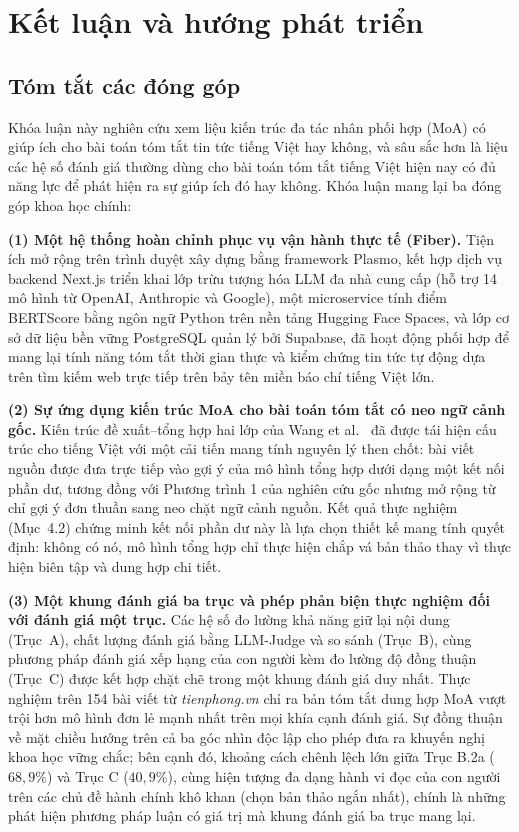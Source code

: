 \chapter{Kết luận và hướng phát triển}
\label{ch:conclusion}

\section{Tóm tắt các đóng góp}

Khóa luận này nghiên cứu xem liệu kiến trúc đa tác nhân phối hợp (MoA) có giúp ích cho bài toán tóm tắt tin tức tiếng Việt hay không, và sâu sắc hơn là liệu các hệ số đánh giá thường dùng cho bài toán tóm tắt tiếng Việt hiện nay có đủ năng lực để phát hiện ra sự giúp ích đó hay không. Khóa luận mang lại ba đóng góp khoa học chính: 

\textbf{(1) Một hệ thống hoàn chỉnh phục vụ vận hành thực tế (Fiber).} Tiện ích mở rộng trên trình duyệt xây dựng bằng framework Plasmo, kết hợp dịch vụ backend Next.js triển khai lớp trừu tượng hóa LLM đa nhà cung cấp (hỗ trợ 14 mô hình từ OpenAI, Anthropic và Google), một microservice tính điểm BERTScore bằng ngôn ngữ Python trên nền tảng Hugging Face Spaces, và lớp cơ sở dữ liệu bền vững PostgreSQL quản lý bởi Supabase, đã hoạt động phối hợp để mang lại tính năng tóm tắt thời gian thực và kiểm chứng tin tức tự động dựa trên tìm kiếm web trực tiếp trên bảy tên miền báo chí tiếng Việt lớn.

\textbf{(2) Sự ứng dụng kiến trúc MoA cho bài toán tóm tắt có neo ngữ cảnh gốc.} Kiến trúc đề xuất--tổng hợp hai lớp của Wang et al.\ \cite{Wang2024} đã được tái hiện cấu trúc cho tiếng Việt với một cải tiến mang tính nguyên lý then chốt: bài viết nguồn được đưa trực tiếp vào gợi ý của mô hình tổng hợp dưới dạng một kết nối phần dư, tương đồng với Phương trình 1 của nghiên cứu gốc nhưng mở rộng từ chỉ gợi ý đơn thuần sang neo chặt ngữ cảnh nguồn. Kết quả thực nghiệm (Mục~4.2) chứng minh kết nối phần dư này là lựa chọn thiết kế mang tính quyết định: không có nó, mô hình tổng hợp chỉ thực hiện chắp vá bản thảo thay vì thực hiện biên tập và dung hợp chi tiết.

\textbf{(3) Một khung đánh giá ba trục và phép phản biện thực nghiệm đối với đánh giá một trục.} Các hệ số đo lường khả năng giữ lại nội dung (Trục~A), chất lượng đánh giá bằng LLM-Judge và so sánh (Trục~B), cùng phương pháp đánh giá xếp hạng của con người kèm đo lường độ đồng thuận (Trục~C) được kết hợp chặt chẽ trong một khung đánh giá duy nhất. Thực nghiệm trên 154 bài viết từ \textit{tienphong.vn} chỉ ra bản tóm tắt dung hợp MoA vượt trội hơn mô hình đơn lẻ mạnh nhất trên mọi khía cạnh đánh giá. Sự đồng thuận về mặt chiều hướng trên cả ba góc nhìn độc lập cho phép đưa ra khuyến nghị khoa học vững chắc; bên cạnh đó, khoảng cách chênh lệch lớn giữa Trục B.2a ($68,9\%$) và Trục C ($40,9\%$), cùng hiện tượng đa dạng hành vi đọc của con người trên các chủ đề hành chính khô khan (chọn bản thảo ngắn nhất), chính là những phát hiện phương pháp luận có giá trị mà khung đánh giá ba trục mang lại.

